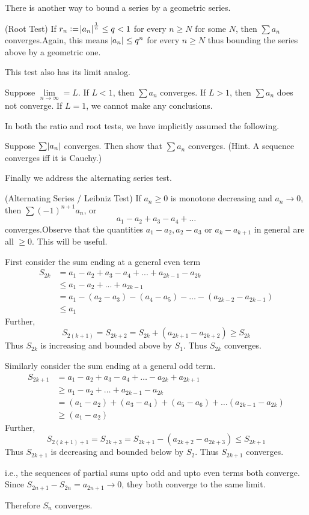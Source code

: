 There is another way to bound a series by a geometric series.
\begin{SWP}{\thm}{(Root Test) If $r_n := \abs{a_n}^{\frac1 n} \leq q < 1$ for every $n \geq N$ for some $N$, then $\sum a_n$ converges.}Again, this means $\abs{a_n} \leq q^n$ for every $n \geq N$ thus bounding the series above by a geometric one.
\end{SWP}
This test also has its limit analog.
\begin{SNP}{\crl}Suppose $\lim\limits_{n\to\infty} = L$. If $L < 1$, then $\sum a_n$ converges. If $L > 1$, then $\sum a_n$ does not converge. If $L = 1$, we cannot make any conclusions.
\end{SNP}
In both the ratio and root tests, we have implicitly assumed the following.
\begin{SNP}{\ex}{Suppose $\sum \abs{a_n}$ converges. Then show that $\sum a_n$ converges. (Hint. A sequence converges iff it is Cauchy.)}
\end{SNP}
Finally we address the alternating series test.
\begin{SWP}{\thm}{(Alternating Series / Leibniz Test) If $a_n \geq 0$ is monotone decreasing and $a_n \to 0$, then $\sum (-1)^{n + 1}a_n$, or
$$
a_1 - a_2 + a_3 - a_4 + \dots
$$converges.}Observe that the quantities $a_1 - a_2, a_2 - a_3$ or $a_k - a_{k + 1}$ in general are all $\geq 0$. This will be useful.

First consider the sum ending at a general even term
\begin{align*}
S_{2k} &= a_1 - a_2 + a_3 - a_4 + ... + a_{2k - 1} - a_{2k}\\
       &\leq a_1 - a_2 + ... + a_{2k - 1}\\
       &= a_1 - (a_2 - a_3) - (a_4 - a_5) - \dots - (a_{2k - 2} - a_{2k - 1})\\
       &\leq a_1
\end{align*}
Further,
$$
S_{2(k + 1)} = S_{2k + 2} = S_{2k} + (a_{2k + 1} - a_{2k + 2}) \geq S_{2k}
$$
Thus $S_{2k}$ is increasing and bounded above by $S_1$. Thus $S_{2k}$ converges.

Similarly consider the sum ending at a general odd term.
\begin{align*}
S_{2k + 1} &= a_1 - a_2 + a_3 - a_4 + \dots -a_{2k} + a_{2k + 1}\\
           &\geq a_1 - a_2 + \dots + a_{2k - 1} - a_{2k}\\
           &= (a_1 - a_2) + (a_3 - a_4) + (a_5 - a_6) + \dots (a_{2k - 1} - a_{2k})\\
           &\geq (a_1 - a_2)
\end{align*}
Further,
$$
S_{2(k + 1) + 1} = S_{2k + 3} = S_{2k + 1} - (a_{2k + 2} - a_{2k + 3}) \leq S_{2k + 1}
$$
Thus $S_{2k + 1}$ is decreasing and bounded below by $S_2$. Thus $S_{2k + 1}$ converges.

i.e., the sequences of partial sums upto odd and upto even terms both converge. Since $S_{2n + 1} - S_{2n} = a_{2n + 1} \to 0$, they both converge to the same limit.

Therefore $S_n$ converges.
\end{SWP}
